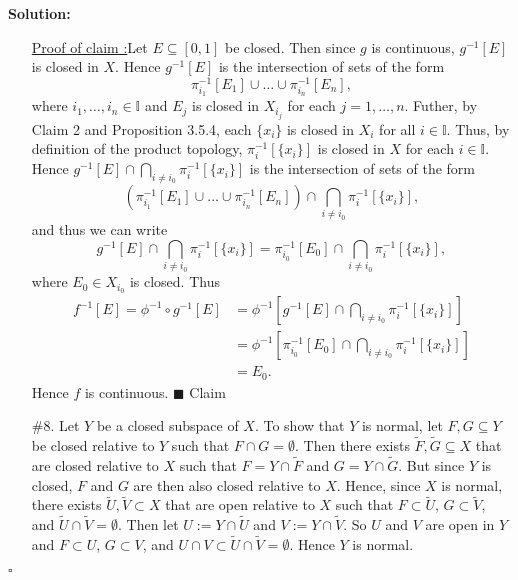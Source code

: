 \documentclass[12pt]{article}
\newcounter{ProofCounter}
\newcounter{ClaimCounter}[ProofCounter]
\newenvironment{Solution}{\stepcounter{ProofCounter}\textbf{Solution:}}{\hfill$\square$}
\newenvironment{claim}[1]{\vspace{1mm}\stepcounter{ClaimCounter}\par\noindent\underline{\bf Claim \theClaimCounter:}\space#1}{}
\newenvironment{claimproof}[1]{\par\noindent\underline{Proof of claim \theClaimCounter:}\space#1}{\hfill $\blacksquare$ Claim \theClaimCounter}
\begin{document}
\begin{Solution}
\begin{enumerate}
      \begin{claimproof}
        Let $E \subseteq [0,1]$ be closed. Then since $g$ is continuous, $g^{-1}[E]$ is closed in $X$. Hence $g^{-1}[E]$ is the intersection of sets
        of the form 
        \[
          \pi_{i_1}^{-1}[E_1] \cup \dots \cup \pi_{i_n}^{-1}[E_n],
        \]
        where $i_1, \dots, i_n \in \mathbb{I}$ and $E_j$ is closed in $X_{i_j}$ for each $j = 1, \dots, n$.
        Futher, by Claim 2 and Proposition 3.5.4, each $\{x_i\}$ is closed in $X_i$ for all $i \in \mathbb{I}$.
        Thus, by definition of the product topology, $\pi_{i}^{-1}[\{x_i\}]$ is closed in $X$ for each $i \in \mathbb{I}$. Hence 
        $g^{-1}[E] \cap \bigcap_{i\neq i_0}\pi_{i}^{-1}[\{x_i\}]$ is the intersection of sets of the form
        \[
          \left(\pi_{i_1}^{-1}[E_1] \cup \dots \cup \pi_{i_n}^{-1}[E_n]\right) \cap \bigcap_{i\neq i_0}\pi_{i}^{-1}[\{x_i\}],
        \]
        and thus we can write 
        \[
          g^{-1}[E] \cap \bigcap_{i\neq i_0}\pi_{i}^{-1}[\{x_i\}] = \pi_{i_0}^{-1}[E_0] \cap \bigcap_{i\neq i_0}\pi_{i}^{-1}[\{x_i\}],
        \]
        where $E_0 \in X_{i_0}$ is closed. Thus 
        \begin{align*}
          f^{-1}[E] = \phi^{-1} \circ g^{-1}[E] & = \phi^{-1}\left[ g^{-1}[E] \cap \bigcap_{i\neq i_0}\pi_{i}^{-1}[\{x_i\}] \right] \\
          & = \phi^{-1}\left[ \pi_{i_0}^{-1}[E_0] \cap \bigcap_{i\neq i_0}\pi_{i}^{-1}[\{x_i\}]\right] \\
          & = E_0.
        \end{align*}
        Hence $f$ is continuous.
      \end{claimproof}

    \item[\#8.] Let $Y$ be a closed subspace of $X$. To show that $Y$ is normal, let $F, G \subseteq Y$ be closed relative to $Y$ such that $F \cap G
      = \emptyset$. Then there exists $\tilde{F}, \tilde{G} \subseteq X$ that are closed relative to $X$ such that $F = Y \cap \tilde{F}$ and $G = Y
      \cap \tilde{G}$. But since $Y$ is closed, $F$ and $G$ are then also closed relative to $X$. Hence, since $X$ is normal, there exists $\tilde{U},
      \tilde{V} \subset X$ that are open relative to $X$ such that $F \subset \tilde{U}$, $G \subset \tilde{V}$, and $\tilde{U} \cap \tilde{V} = \emptyset$.
      Then let $U := Y \cap \tilde{U}$ and $V := Y \cap \tilde{V}$. So $U$ and $V$ are open in $Y$ and $F \subset U$, $G \subset V$, and $U \cap V
      \subset \tilde{U} \cap \tilde{V} = \emptyset$. Hence $Y$ is normal.
  \end{enumerate}
\end{Solution}
\end{document}
